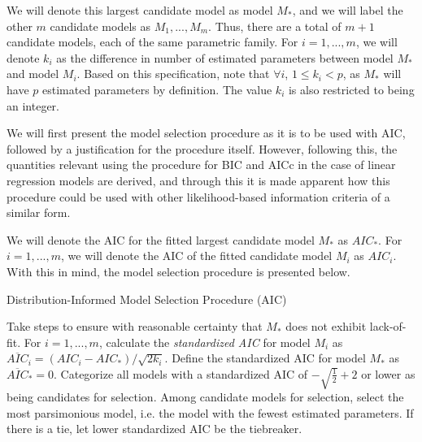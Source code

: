 		We will denote this largest candidate model as model $M_*$, and we will label the other $m$ candidate models as $M_1,...,M_m$. Thus, there are a total of $m+1$ candidate
		models, each of the same parametric family. For $i=1,...,m$, we will denote $k_i$ as the difference in number of estimated parameters between model $M_*$ and model
		$M_i$. Based on this specification, note that $\forall i$, $1 \le k_i < p$, as $M_*$ will have $p$ estimated parameters by definition. The value $k_i$ is also restricted to
		being an integer.

		We will first present the model selection procedure as it is to be used with AIC, followed by a justification for the procedure itself. However, following this, the quantities relevant using the procedure for BIC and AICc in the case of linear regression models are derived, and through this
		it is made apparent how this procedure could be used with other likelihood-based information criteria of a similar form.

		We will denote the AIC for the fitted largest candidate model $M_*$ as $AIC_*$. For $i=1,...,m$, we will denote the AIC of the fitted candidate model $M_i$ as 
		$AIC_i$. With this in mind, the model selection procedure is presented below.

		\pagebreak

		\begin{algorithm}[H]
			\caption{Distribution-Informed Model Selection Procedure (AIC)}
			\begin{algorithmic}[1]
			  \State Take steps to ensure with reasonable certainty that $M_*$ does not exhibit lack-of-fit.
			  \State For $i = 1,...,m$, calculate the \textit{standardized AIC} for model $M_i$ as 
			  $\overline{AIC}_i = (AIC_i - AIC_*) / \sqrt{2k_i} $. Define the standardized AIC for model
			  $M_*$ as $\overline{AIC}_* = 0$.
			  \State Categorize all models with a standardized AIC of $ -\sqrt{\frac{1}{2}} + 2$ or lower as
			  being candidates for selection.
			  \State Among candidate models for selection, select the most parsimonious model, i.e. the model
			  with the fewest estimated parameters. If there is a tie, let lower standardized AIC be the
			  tiebreaker.
			\end{algorithmic}
		\end{algorithm}

